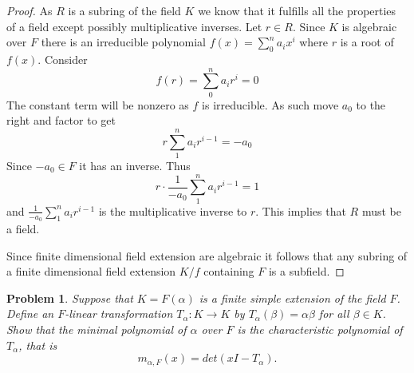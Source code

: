 \documentclass[10pt]{article}
\newcommand{\sk}{\vskip 10mm}
\theoremstyle{plain}
\newtheorem{problem}{Problem}
\theoremstyle{remark}
\begin{document}
\begin{proof}
  As $R$ is a subring of the field $K$ we know that it fulfills all the
  properties of a field except possibly multiplicative inverses. Let
  $r\in R$. Since $K$ is algebraic over $F$ there is an irreducible
  polynomial $f(x)=\sum_0^na_ix^i$ where $r$ is a root of $f(x)$. Consider
  \[f(r)=\sum_0^na_ir^i=0 \]
  The constant term will be nonzero as $f$ is irreducible. As such
  move $a_0$ to the right and factor to get
  \[r\sum_1^na_ir^{i-1} = -a_0\]
  Since $-a_0\in F$ it has an inverse. Thus
  \[r\cdot\frac{1}{-a_0}\sum_1^na_ir^{i-1}=1 \]
  and $\frac{1}{-a_0}\sum_1^na_ir^{i-1}$ is the multiplicative inverse to $r$.
  This implies that $R$ must be a field.

  Since finite dimensional field extension are algebraic it follows that any
  subring of a finite dimensional field extension $K/f$ containing $F$ is a
  subfield.
\end{proof}

\sk

\begin{problem}
  Suppose that $K = F(\alpha)$ is a finite simple extension of the field $F$.
  Define an $F$-linear transformation
  $T_\alpha: K \to K$ by $T_\alpha (\beta) = \alpha\beta$ for all $\beta \in K$.
  Show that the minimal polynomial of $\alpha$ over $F$ is the characteristic
  polynomial of $T_\alpha$, that is
  \begin{equation*}
    m_{\alpha, F}(x) = det(xI - T_\alpha).
  \end{equation*}
\end{problem}
\end{document}
